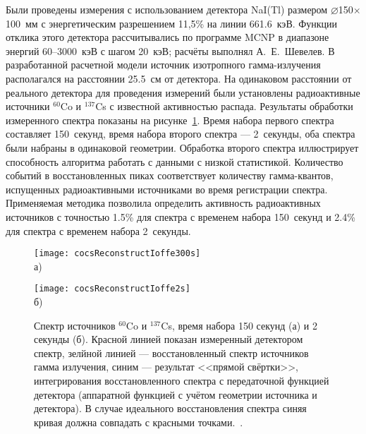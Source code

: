 Были проведены измерения с использованием детектора NaI(Tl) размером $\varnothing$150$\times$100~мм с энергетическим разрешением 11,5\% на линии 661.6~кэВ. Функции отклика этого детектора рассчитывались по программе MCNP в диапазоне энергий 60--3000~кэВ с шагом 20~кэВ; расчёты выполнял А.~Е.~Шевелев. В разработанной расчетной модели источник изотропного гамма-излучения располагался на расстоянии 25.5~см от детектора. На одинаковом расстоянии от реального детектора для проведения измерений были установлены радиоактивные источники ${}^{60}$Co и ${}^{137}$Cs с известной активностью распада. Результаты обработки измеренного спектра показаны на рисунке~\ref{fig:cocsReconstructIoffe}. Время набора первого спектра составляет 150~секунд, время набора второго спектра --- 2~секунды, оба спектра были набраны в одинаковой геометрии. Обработка второго спектра иллюстрирует способность алгоритма работать с данными с низкой статистикой. Количество событий в восстановленных пиках соответствует количеству гамма-квантов, испущенных радиоактивными источниками во время регистрации спектра. Применяемая методика позволила определить активность радиоактивных источников с точностью 1.5\% для спектра с временем набора 150~секунд и 2.4\% для спектра с временем набора 2~секунды.~\cite{Shevelev2013}

\begin{figure}[ht!]
    \begin{minipage}[b][][b]{0.95\linewidth}\centering
        \texttt{[image: cocsReconstructIoffe300s]} \\ а) \\
    \end{minipage}
    \vfill
    \begin{minipage}[b][][b]{0.95\linewidth}\centering
        \texttt{[image: cocsReconstructIoffe2s]} \\ б) \\
    \end{minipage}
    \vspace{5mm}
    \caption{ Спектр источников ${}^{60}$Co и ${}^{137}$Cs, время набора 150 секунд (а) и 2 секунды (б). Красной линией показан измеренный детектором спектр, зелйной линией --- восстановленный спектр источников гамма излучения, синим --- результат <<прямой свёртки>>, интегрирования восстановленного спектра с передаточной функцией детектора (аппаратной функцией с учётом геометрии источника и детектора). В случае идеального восстановления спектра синяя кривая должна совпадать с красными точками.~\cite{Shevelev2013}. }
    \label{fig:cocsReconstructIoffe}
\end{figure}
\FloatBarrier

